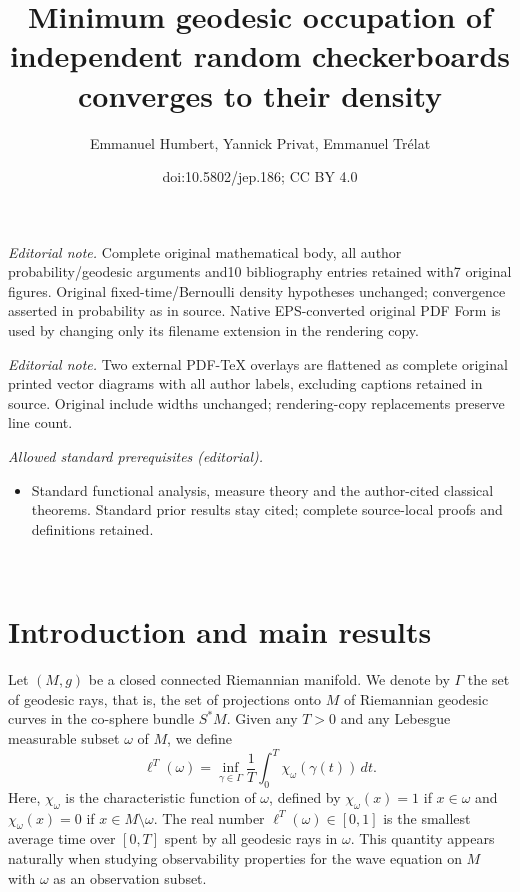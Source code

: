 \documentclass[10pt]{amsart}
\title{Minimum geodesic occupation of independent random checkerboards converges to their density}
\author{Emmanuel Humbert, Yannick Privat, Emmanuel Trélat}
\date{doi:10.5802/jep.186; CC BY 4.0}
\theoremstyle{definition}
\begin{document}
\maketitle
\noindent\textit{Editorial note.} Complete original mathematical body, all author probability/geodesic arguments and10 bibliography entries retained with7 original figures. Original fixed-time/Bernoulli density hypotheses unchanged; convergence asserted in probability as in source. Native EPS-converted original PDF Form is used by changing only its filename extension in the rendering copy.\par\medskip
\noindent\textit{Editorial note.} Two external PDF-TeX overlays are flattened as complete original printed vector diagrams with all author labels, excluding captions retained in source. Original include widths unchanged; rendering-copy replacements preserve line count.\par\medskip
\noindent\textit{Allowed standard prerequisites (editorial).}\begin{itemize}
\item Standard functional analysis, measure theory and the author-cited classical theorems. Standard prior results stay cited; complete source-local proofs and definitions retained.
\end{itemize}\medskip
\vspace*{-\baselineskip}\enlargethispage{\baselineskip}%
\tableofcontents


\vspace*{-3.5\baselineskip}\mbox{ }
\section{Introduction and main results}\label{sec1}
Let $(M,g)$ be a closed connected Riemannian manifold.
We denote by $\Gamma$ the set of geodesic rays, that is, the set of projections onto $M$ of Riemannian geodesic curves in the co-sphere bundle $S^*M$.
Given any $T>0$ and any Lebesgue measurable subset $\omega$ of $M$, we define\vspace*{-3pt}
\begin{equation}\label{defg2}
\ell^T(\omega) = \inf_{\gamma\in\Gamma} \frac{1}{T} \int_0^T \chi_\omega(\gamma(t)) \, dt.
\end{equation}
Here, $\chi_\omega$ is the characteristic function of $\omega$, defined by $\chi_\omega(x)=1$ if $x\in\omega$ and $\chi_\omega(x)=0$ if $x\in M\setminus\omega$.
The real number $\ell^T(\omega)\in[0,1]$ is the smallest average time over $[0,T]$ spent by all geodesic rays in $\omega$.
This quantity appears naturally when studying observability properties for the wave equation on $M$ with $\omega$ as an observation subset.
\end{document}
